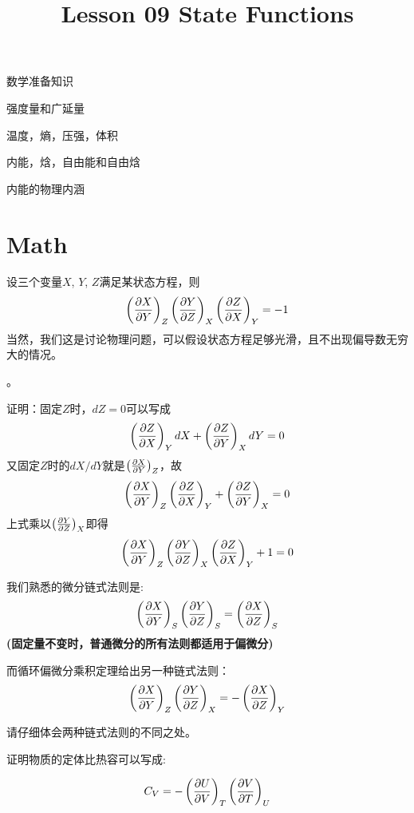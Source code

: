 \documentclass[CJK]{beamer}
\title{Lesson 09 State Functions}
\author{}
\date{}
\begin{document}


\begin{frame}
\bch
\bitem
\item{数学准备知识}
\item{强度量和广延量}
\item{温度，熵，压强，体积}
\item{内能，焓，自由能和自由焓}
\item{内能的物理内涵}
\eitem
\ech
\end{frame}

\section{Math}

\begin{frame}
\bch
设三个变量$X$, $Y$, $Z$满足某状态方程，则
{\blue 
$$\pfrac XYZ  \pfrac YZX \pfrac ZXY = -1$$
}
当然，我们这是讨论物理问题，可以假设状态方程足够光滑，且不出现偏导数无穷大的情况。

\skipline

。
\ech
\end{frame}


\begin{frame}
\bch
{\scriptsize
证明：固定$Z$时，$dZ = 0$可以写成
$$\pfrac ZXY dX + \pfrac ZYX dY = 0$$
又固定$Z$时的$dX/dY$就是$\pfrac XYZ$，故
$$\pfrac XYZ \pfrac ZXY + \pfrac ZYX = 0$$
上式乘以$\pfrac YZX$即得
$$\pfrac XYZ \pfrac YZX \pfrac ZXY + 1 = 0$$
}
\ech
\end{frame}

\begin{frame}
\bch
我们熟悉的微分链式法则是:
$$\pfrac XYS \pfrac YZS = \pfrac XZS$$
{\small \bf (固定量不变时，普通微分的所有法则都适用于偏微分)}
 
\skipline

而循环偏微分乘积定理给出另一种链式法则：
$$\pfrac XYZ \pfrac YZX = -\pfrac XZY $$

\skiplines

请仔细体会两种链式法则的不同之处。
\ech
\end{frame}



\begin{frame}
\bch
{}

证明物质的定体比热容可以写成:

$$
C_V =  - \pfrac UVT \pfrac VTU 
$$

\ech
\end{frame}
\end{document}
